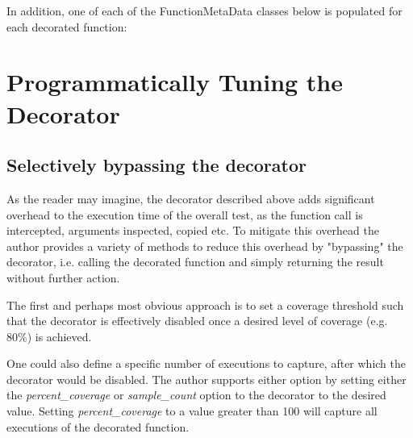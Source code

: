 
In addition, one of each of the FunctionMetaData classes below is populated for each decorated function:



\section{Programmatically Tuning the Decorator}\label{sec:decorator tuning}

\subsection{Selectively bypassing the decorator}\label{sec:tuning-1}

As the reader may imagine, the decorator described above adds significant overhead 
to the execution time of the overall test, as the function call is intercepted,
arguments inspected, copied etc.  To mitigate this overhead the author provides 
a variety of methods to 
reduce this overhead by "bypassing" the decorator, i.e. calling the decorated 
function and simply returning the result without further action.

The first and perhaps most obvious approach is to set a coverage threshold such 
that the decorator is effectively disabled once a desired level of coverage 
(e.g. 80\%) is achieved. 

One could also define a specific number 
of executions to capture, after which the decorator would be disabled. 
The author supports either option by setting either the \textit{percent\_coverage} or 
\textit{sample\_count} option to the decorator to the desired value.  Setting 
\textit{percent\_coverage} to a value greater than 100 will capture all 
executions of the decorated function.


